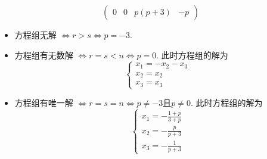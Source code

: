 \documentclass{article}
\begin{document}
\begin{itemize}
$$\begin{pmatrix}
        0 & 0 & p(p + 3) & -p
    \end{pmatrix}
    $$
    \begin{itemize}
        \item 方程组无解 $\Leftrightarrow r > s \Leftrightarrow p = -3$.
        \item 方程组有无数解 $\Leftrightarrow r = s < n \Leftrightarrow p = 0$.
            此时方程组的解为
            $$\begin{cases}
                x_1 = - x_2 - x_3\\
                x_2 = x_2 \\
                x_3 = x_3
            \end{cases}
            $$
        \item 方程组有唯一解 $\Leftrightarrow r = s = n \Leftrightarrow p \neq -3 \text{且} p \neq 0 $.
            此时方程组的解为
            $$
            \begin{cases}
                x_1 = -\frac{1 + p}{3 + p} \\
                x_2 = -\frac{p}{p + 3} \\
                x_3 = -\frac{1}{p + 3}
            \end{cases}
            $$
    \end{itemize}

\end{itemize}
\end{document}
